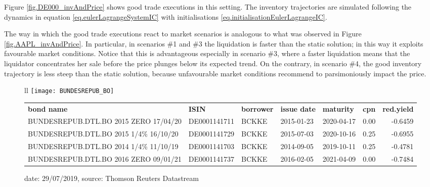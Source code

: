 \documentclass[10pt,a4paper]{article}
\begin{document}
	Figure \ref{fig.DE000_invAndPrice} shows good trade executions in this setting. The inventory trajectories are simulated following the dynamics in equation \eqref{eq.eulerLagrangeSystemIC} with initialisations \eqref{eq.initialisationEulerLagrangeIC}.
	
	The way in which the good trade executions react to market scenarios is analogous to what was observed in Figure \ref{fig.AAPL_invAndPrice}. In particular, in scenarios \#1 and \#3 the liquidation is faster than the static solution; in this way it exploits favourable market conditions. Notice that this is advantageous especially in scenario \#3, where a faster liquidation means that the liquidator concentrates her sale before the price plunges below its expected trend. On the contrary, in scenario \#4, the good inventory trajectory is less steep than the static solution, because unfavourable market conditions recommend to parsimoniously impact the price.  
	
	
	
	\begin{center}
		\begin{figure}
		\centering
		\begin{tabular}{ll}
		\texttt{[image: BUNDESREPUB\_BO]}
		\\
		\begin{tiny}
		\begin{tabular}{lllllrr}
		
			  \textbf{bond name} &          \textbf{ISIN} & \textbf{borrower} & \textbf{issue date} & \textbf{maturity} &  \textbf{cpn} &  \textbf{red.yield}  \\
		
		    	BUNDESREPUB.DTL.BO 2015 ZERO 17/04/20  &  DE0001141711 &         BCKKE & 2015-01-23 &           2020-04-17 &    0.00 &           -0.6459  \\
		     	BUNDESREPUB.DTL.BO 2015 1/4\% 16/10/20  &  DE0001141729 &         BCKKE & 2015-07-03 &           2020-10-16 &    0.25 &           -0.6955  \\ 
		      	BUNDESREPUB.DTL.BO 2014 1/4\% 11/10/19  &  DE0001141703 &         BCKKE & 2014-09-05 &           2019-10-11 &    0.25 &           -0.4781  \\ 
		       	BUNDESREPUB.DTL.BO 2016 ZERO 09/01/21 &  DE0001141737 &         BCKKE & 2016-02-05 &           2021-04-09 &    0.00 &           -0.7484  \\
			
		\end{tabular}
		\end{tiny}
		\end{tabular}
	\caption{{date: 29/07/2019, source: Thomson Reuters Datastream}}
	\label{fig.historicalBundPrices}
		\end{figure}	
\end{center}
	
\end{document}
